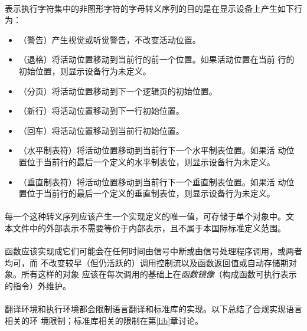 \paragraph{}
表示执行字符集中的非图形字符的字母转义序列的目的是在显示设备上产生如下行为：
\begin{itemize}
  \item{（警告）产生视觉或听觉警告，不改变活动位置。}
  \item{（退格）将活动位置移动到当前行的前一个位置。如果活动位置在当前
    行的初始位置，则显示设备行为未定义。}
  \item{（分页）将活动位置移动到下一个逻辑页的初始位置。}
  \item{（新行）将活动位置移动到下一行初始位置。}
  \item{（回车）将活动位置移动到当前行初始位置。}
  \item{（水平制表符）将活动位置移动到当前行下一个水平制表位置。如果活
    动位置位于当前行的最后一个定义的水平制表位，则显示设备行为未定义。}
  \item{（垂直制表符）将活动位置移动到当前行下一个垂直制表位置。如果活
    动位置位于当前行的最后一个定义的垂直制表位，则显示设备行为未定义。}
\end{itemize}

\paragraph{}
每一个这种转义序列应该产生一个实现定义的唯一值，可存储于单个对象中。文
本文件中的外部表示不需要等价于内部表示，且不属于本国际标准定义范围。


\paragraph{}
函数应该实现成它们可能会在任何时间由信号中断或由信号处理程序调用，或两者均可，而
不改变较早（但仍活跃的）调用控制流以及函数返回值或自动存储期对象。所有这样的对象
应该在每次调用的基础上在\textit{函数镜像}（构成函数可执行表示的指令）外维护。

\paragraph{}
翻译环境和执行环境都会限制语言翻译和标准库的实现。以下总结了合规实现语言相关的环
境限制；标准库相关的限制在第\ref{lib}章讨论。

